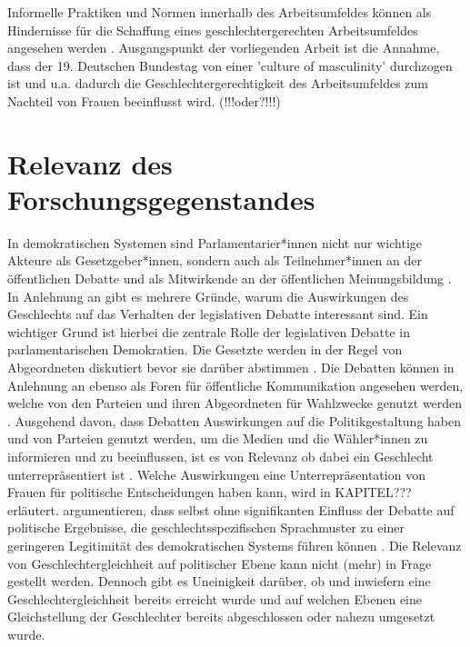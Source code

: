 \documentclass[12pt, 
    twoside=false, 
    bibliography=totoc, 
    numbers=endperiod, 
    headings=normal, 
    toc=chapterentrydotfill
    ]{scrbook}
\begin{document}
\begin{quote}
     \parencite[200]{erikson_2018}
\end{quote}

Informelle Praktiken und Normen innerhalb des Arbeitsumfeldes können als Hindernisse für die Schaffung eines geschlechtergerechten Arbeitsumfeldes angesehen werden \parencite[200]{erikson_2018}. Ausgangspunkt der vorliegenden Arbeit ist die Annahme, dass der 19. Deutschen Bundestag von einer 'culture of masculinity' durchzogen ist und u.a. dadurch die Geschlechtergerechtigkeit des Arbeitsumfeldes zum Nachteil von Frauen beeinflusst wird. (!!!oder?!!!)

\chapter{Relevanz des Forschungsgegenstandes}

In demokratischen Systemen sind Parlamentarier*innen nicht nur wichtige Akteure als Gesetzgeber*innen, sondern auch als Teilnehmer*innen an der öffentlichen Debatte und als Mitwirkende an der öffentlichen Meinungsbildung \parencite[188]{dahlerup_2018}.
In Anlehnung an \textcite{back_2018} gibt es mehrere Gründe, warum die Auswirkungen des Geschlechts auf das Verhalten der legislativen Debatte interessant sind. Ein wichtiger Grund ist hierbei die zentrale Rolle der legislativen Debatte in parlamentarischen Demokratien. Die Gesetzte werden in der Regel von Abgeordneten diskutiert bevor sie darüber abstimmen \parencites[2]{back_2018}{back_2016}{proksch_2015}. 
Die Debatten können in Anlehnung an \textcite[1]{proksch_2015} ebenso als Foren für öffentliche Kommunikation angesehen werden, welche von den Parteien und ihren Abgeordneten für Wahlzwecke genutzt werden \parencite[2]{back_2018}. Ausgehend davon, dass Debatten Auswirkungen auf die Politikgestaltung haben und von Parteien genutzt werden, um die Medien und die Wähler*innen zu informieren und zu beeinflussen, ist es von Relevanz ob dabei ein Geschlecht unterrepräsentiert ist \parencite[2]{back_2018}. Welche Auswirkungen eine Unterrepräsentation von Frauen für politische Entscheidungen haben kann, wird in KAPITEL??? erläutert. \textcite{back_2018} argumentieren, dass selbst ohne signifikanten Einfluss der Debatte auf politische Ergebnisse, die geschlechtsspezifischen Sprachmuster zu einer geringeren Legitimität des demokratischen Systems führen können \parencite[2]{back_2018}.
Die Relevanz von Geschlechtergleichheit auf politischer Ebene kann nicht (mehr) in Frage gestellt werden. Dennoch gibt es Uneinigkeit darüber, ob und inwiefern eine Geschlechtergleichheit bereits erreicht wurde und auf welchen Ebenen eine Gleichstellung der Geschlechter bereits abgeschlossen oder nahezu umgesetzt wurde.
\end{document}

